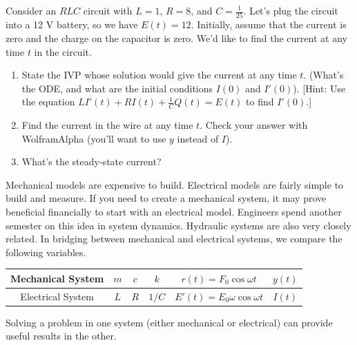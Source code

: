 \begin{problem}
Consider an $RLC$ circuit with $L=1$, $R=8$, and $C=\frac{1}{25}$. Let's plug the circuit into a 12 V battery, so we have $E(t) =12$.  Initially, assume that the current is zero and the charge on the capacitor is zero. We'd like to find the current at any time $t$ in the circuit.
\begin{enumerate}
 \item State the IVP whose solution would give the current at any time $t$. (What's the ODE, and what are the initial conditions $I(0)$ and $I'(0)$).  [Hint: Use the equation $L I'(t)+ RI(t)+ \frac{1}{C}Q(t) =E(t)$ to find $I'(0)$.] 
 \item Find the current in the wire at any time $t$. Check your answer with WolframAlpha (you'll want to use $y$ instead of $I$).
 \item What's the steady-state current?
\end{enumerate}

\end{problem}

\begin{observation}
Mechanical models are expensive to build.  Electrical models are fairly simple to build and measure.  If you need to create a mechanical system, it may prove beneficial financially to start with an electrical model. Engineers spend another semester on this idea in system dynamics.  Hydraulic systems are also very closely related. In bridging between mechanical and electrical systems, we compare the following variables. 
\begin{center}
\begin{tabular}{|c|c|c|c|c|c|}
\hline
Mechanical System&$m$&$c$&$k$&$r(t)=F_0\cos\omega t$&$y(t)$\\\hline
Electrical System&$L$&$R$&$1/C$&$E'(t) = E_0\omega\cos\omega t$&$I(t)$\\
\hline
\end{tabular}
\end{center}
Solving a problem in one system (either mechanical or electrical) can provide useful results in the other.  
\end{observation}





